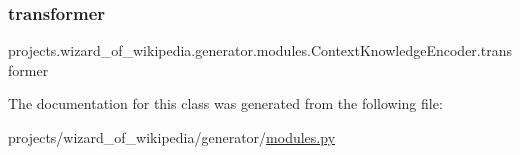 \subsubsection{\texorpdfstring{transformer}{transformer}}
{\footnotesize\ttfamily projects.\+wizard\+\_\+of\+\_\+wikipedia.\+generator.\+modules.\+Context\+Knowledge\+Encoder.\+transformer}



The documentation for this class was generated from the following file\+:\begin{DoxyCompactItemize}
\item 
projects/wizard\+\_\+of\+\_\+wikipedia/generator/\hyperlink{projects_2wizard__of__wikipedia_2generator_2modules_8py}{modules.\+py}\end{DoxyCompactItemize}
